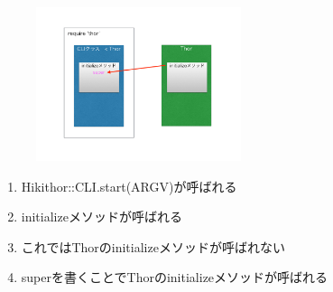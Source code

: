 \begin{figure}[htbp]\begin{center}
\includegraphics[width=6cm,bb=0 0 442 500]{../figs/./hikiutils_yamane.003.jpg}
\caption{}
\label{default}\end{center}\end{figure}
\begin{enumerate}
\item Hikithor::CLI.start(ARGV)が呼ばれる
\item initializeメソッドが呼ばれる
\item これではThorのinitializeメソッドが呼ばれない
\item superを書くことでThorのinitializeメソッドが呼ばれる
\end{enumerate}
